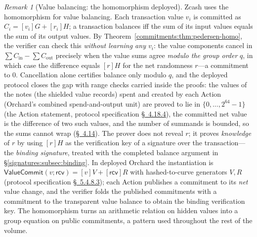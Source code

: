 \documentclass[11pt,a4paper]{article}
\theoremstyle{definition}
\theoremstyle{remark}
\newtheorem{remark}[theorem]{Remark}
\begin{document}
\begin{remark}[Value balancing: the homomorphism deployed]
\label{commitments:rem:homo-uses}
Zcash uses the homomorphism for value balancing. Each transaction value
\(v_i\) is committed as \(C_i = [v_i]G + [r_i]H\); a transaction
balances iff the sum of its
input values equals the sum of its output values. By
Theorem~\ref{commitments:thm:pedersen-homo}, the verifier can check
this \emph{without learning any \(v_i\)}: the value components
cancel in
\(\sum C_{\mathrm{in}} - \sum C_{\mathrm{out}}\) precisely when the
value sums agree \emph{modulo the group order} \(q\), in which case
the difference equals \([r]H\) for the net randomness \(r\)---a
commitment to \(0\). Cancellation alone certifies balance only
modulo \(q\), and the deployed protocol closes the gap with range
checks carried inside the proofs: the values of the notes (the shielded
value records) spent and created by each Action (Orchard's combined
spend-and-output unit) are proved to lie in
\(\{0, \dots, 2^{64}-1\}\) (the Action statement, protocol specification
\href{https://zips.z.cash/protocol/protocol.pdf\#actionstatement}{\S~4.18.4}),
the committed net value is the difference of two such values, and the number of
summands is bounded, so the sums cannot wrap
(\href{https://zips.z.cash/protocol/protocol.pdf\#orchardbalance}{\S~4.14}).
The prover does not reveal \(r\); it proves \emph{knowledge} of \(r\) by using
\([r]H\) as the verification key of a signature over the
transaction---the \emph{binding signature}, treated with the
completed balance argument in \S\ref{signatures:subsec:binding}. In
deployed Orchard the instantiation is
\(\mathsf{ValueCommit}(v; \mathsf{rcv}) = [v]V + [\mathsf{rcv}]R\)
with hashed-to-curve generators \(V, R\)
(protocol specification
\href{https://zips.z.cash/protocol/protocol.pdf\#concretehomomorphiccommit}{\S~5.4.8.3});
each Action publishes a commitment to its \emph{net} value change, and
the verifier folds the published commitments with a commitment to the
transparent value balance to obtain the binding verification key. The
homomorphism turns an arithmetic relation on hidden values into a
group equation on public commitments, a pattern used throughout the
rest of the volume.
\end{remark}
\end{document}
